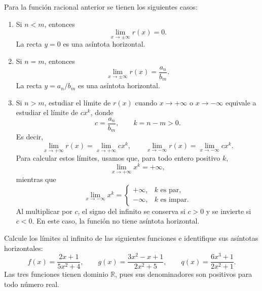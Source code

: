 \documentclass[10pt,a5paper]{article}
\newif\ifmostrarSoluciones
\begin{document}
\begin{proposicion}
Para la función racional anterior se tienen los siguientes casos:
\begin{enumerate}
  \item Si $n<m$, entonces
  \[
    \lim_{x\to\pm\infty}r(x)=0.
  \]
  La recta $y=0$ es una asíntota horizontal.
  \item Si $n=m$, entonces
  \[
    \lim_{x\to\pm\infty}r(x)=\frac{a_n}{b_m}.
  \]
  La recta $y=a_n/b_m$ es una asíntota horizontal.
  \item Si $n>m$, estudiar el límite de $r(x)$ cuando $x\to+\infty$ o $x\to-\infty$ equivale a estudiar el límite de $cx^k$, donde
  \[
    c=\frac{a_n}{b_m},\qquad k=n-m>0.
  \]
  Es decir,
  \[
    \lim_{x\to+\infty}r(x)=\lim_{x\to+\infty}cx^k,
    \qquad
    \lim_{x\to-\infty}r(x)=\lim_{x\to-\infty}cx^k.
  \]
  Para calcular estos límites, usamos que, para todo entero positivo $k$,
  \[
    \lim_{x\to+\infty}x^k=+\infty,
  \]
  mientras que
  \[
    \lim_{x\to-\infty}x^k=
    \begin{cases}
      +\infty, & k\text{ es par},\\
      -\infty, & k\text{ es impar}.
    \end{cases}
  \]
  Al multiplicar por $c$, el signo del infinito se conserva si $c>0$ y se invierte si $c<0$. En este caso, la función no tiene asíntota horizontal.
\end{enumerate}
\end{proposicion}

\begin{ejemplo}
Calcule los límites al infinito de las siguientes funciones e identifique sus asíntotas horizontales:
\[
  f(x)=\frac{2x+1}{5x^2+4},
  \qquad
  g(x)=\frac{3x^2-x+1}{2x^2+5},
  \qquad
  q(x)=\frac{6x^3+1}{2x^2+1}.
\]
Las tres funciones tienen dominio $\mathbb{R}$, pues sus denominadores son positivos para todo número real.
\end{ejemplo}
\ifmostrarSoluciones
\begin{solucion}
En $f$, estudiar el límite equivale a estudiar el cociente de sus términos de mayor grado:
\[
  \lim_{x\to\pm\infty}f(x)
  =\lim_{x\to\pm\infty}\frac{2x}{5x^2}
  =\lim_{x\to\pm\infty}\frac{2}{5x}=0.
\]
Por tanto, $y=0$ es una asíntota horizontal. En $g$, el estudio del límite equivale al del cociente $3x^2/(2x^2)$:
\[
  \lim_{x\to\pm\infty}g(x)
  =\lim_{x\to\pm\infty}\frac{3x^2}{2x^2}
  =\frac{3}{2}.
\]
Así, $y=3/2$ es una asíntota horizontal. En $q$, tenemos la equivalencia asintótica
\[
  q(x)=\frac{6x^3+1}{2x^2+1}\sim\frac{6x^3}{2x^2}=3x
  \qquad (x\to\pm\infty).
\]
Por tanto,
\[
  \lim_{x\to+\infty}q(x)=\lim_{x\to+\infty}3x=+\infty,
\]
\[
  \lim_{x\to-\infty}q(x)=\lim_{x\to-\infty}3x=-\infty.
\]
Por tanto, $q$ no tiene asíntota horizontal.
\end{solucion}
\else\vspace{24mm}\fi
\end{document}
